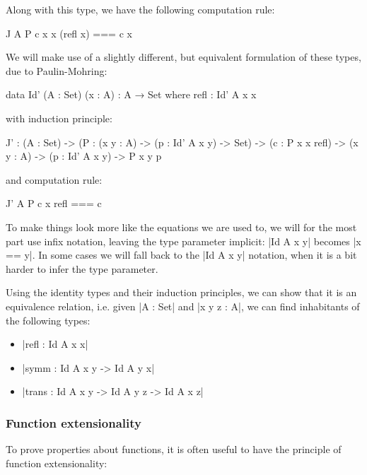 Along with this type, we have the following computation rule:

\begin{code}
  J A P c x x (refl x) === c x
\end{code}

\newpage

We will make use of a slightly different, but equivalent formulation
of these types, due to Paulin-Mohring:

\begin{code}
  data Id' (A : Set) (x : A) : A → Set where
    refl : Id' A x x
\end{code}

with induction principle:

\begin{code}
  J' :  (A : Set)
    ->  (P : (x y : A) -> (p : Id' A x y) -> Set)
    ->  (c : P x x refl)
    ->  (x y : A) -> (p : Id' A x y)
    ->  P x y p
\end{code}

and computation rule:

\begin{code}
  J' A P c x refl === c
\end{code}

To make things look more like the equations we are used to, we will
for the most part use infix notation, leaving the type parameter
implicit: |Id A x y| becomes |x == y|. In some cases we will fall back
to the |Id A x y| notation, when it is a bit harder to infer the type
parameter.

Using the identity types and their induction principles, we can show
that it is an equivalence relation, i.e. given |A : Set| and |x y z :
A|, we can find inhabitants of the following types:

\begin{itemize}
\item |refl   : Id A x x|
\item |symm   : Id A x y -> Id A y x|
\item |trans  : Id A x y -> Id A y z -> Id A x z|
\end{itemize}

\subsubsection{Function extensionality}
\label{sec:funext}

To prove properties about functions, it is often useful to have the
principle of function extensionality:

